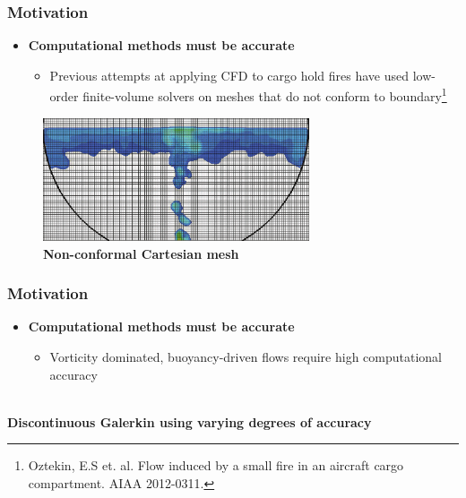 \documentclass[9pt]{beamer}
\begin{document}
\begin{frame}
\frametitle{Motivation}
\label{sec-4-5}

\begin{itemize}
\item \textbf{Computational methods must be accurate}
\begin{itemize}
\item Previous attempts at applying CFD to cargo hold fires have used
    low-order finite-volume solvers on meshes that do not conform to
    boundary\footnote{Oztekin, E.S et. al. Flow induced by a small fire in
an aircraft cargo compartment. AIAA 2012-0311.
 }
\end{itemize}
\end{itemize}
\centering
\begin{figure}[ht]
\includegraphics[width=0.7\textwidth]{CutCellGeometry.png} \\
\textbf{Non-conformal Cartesian mesh}
\end{figure}
\end{frame}
\begin{frame}
\frametitle{Motivation}
\label{sec-4-6}

\begin{itemize}
\item \textbf{Computational methods must be accurate}
\begin{itemize}
\item Vorticity dominated, buoyancy-driven flows require high
    computational accuracy
\end{itemize}
\end{itemize}
\centering
{} \\
\textbf{Discontinuous Galerkin using varying degrees of accuracy}
\end{frame}
\end{document}
